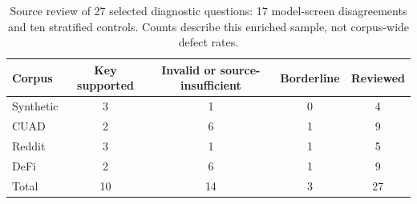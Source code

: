 \begin{table}[h]\centering\footnotesize
\caption{Source review of 27 selected diagnostic questions: 17 model-screen disagreements and ten stratified controls. Counts describe this enriched sample, not corpus-wide defect rates.}
\label{tab:review}
\begin{tabular}{@{}lcccc@{}}\toprule
Corpus & Key supported & Invalid or source-insufficient & Borderline & Reviewed\\\midrule
Synthetic & 3 & 1 & 0 & 4\\
CUAD & 2 & 6 & 1 & 9\\
Reddit & 3 & 1 & 1 & 5\\
DeFi & 2 & 6 & 1 & 9\\\midrule
Total & 10 & 14 & 3 & 27\\\bottomrule
\end{tabular}\end{table}
